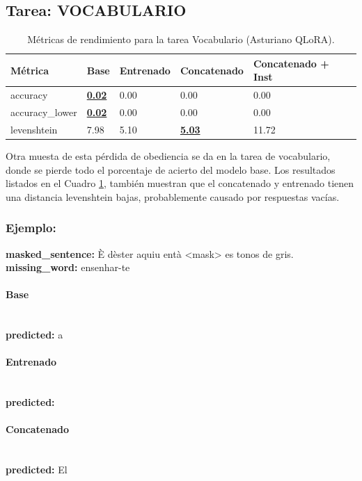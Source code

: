 \subsection{Tarea: VOCABULARIO}\label{tarea-vocabulario}
\begin{longtable}[]{@{}lllll@{}}
\toprule\noalign{}
Métrica & Base & Entrenado & Concatenado & Concatenado + Inst \\
\midrule\noalign{}
\endhead
\bottomrule\noalign{}
\caption{Métricas de rendimiento para la tarea Vocabulario (Asturiano QLoRA).}
\label{tab:metricas_vocabulario_Asturiano QLoRA}
\endlastfoot
accuracy & \textbf{\underline{0.02}} & 0.00 & 0.00 & 0.00 \\
accuracy\_lower & \textbf{\underline{0.02}} & 0.00 & 0.00 & 0.00 \\
levenshtein & 7.98 & 5.10 & \textbf{\underline{5.03}} & 11.72 \\
\end{longtable}

Otra muesta de esta pérdida de obediencia se da en la tarea de vocabulario, donde se pierde todo el porcentaje de acierto del modelo base. Los resultados listados en el Cuadro \ref{tab:metricas_vocabulario_Asturiano QLoRA}, también muestran que el concatenado y entrenado tienen una distancia levenshtein bajas, probablemente causado por respuestas vacías.

\subsubsection{Ejemplo:}
\textbf{masked\_sentence:} È d\textquotesingle{}èster aquiu entà {\textless}mask{\textgreater} es tonos de gris.\\
\textbf{missing\_word:} ensenhar-te

\paragraph{Base}~\\
\textbf{predicted:} a

\paragraph{Entrenado}~\\
\textbf{predicted:} 

\paragraph{Concatenado}~\\
\textbf{predicted:} El


